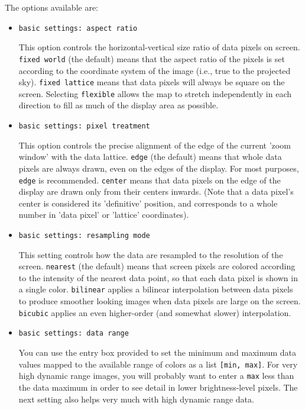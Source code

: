The options available are:
\begin{itemize}

\item {\tt basic settings: aspect ratio}

This option controls the horizontal-vertical size ratio of data pixels
on screen.  {\tt fixed world} (the default) means that the aspect
ratio of the pixels is set according to the coordinate system of
the image (i.e., true to the projected sky). {\tt fixed lattice}
means that data pixels will always be square on the screen.  Selecting
{\tt flexible} allows the map to stretch independently in each
direction to fill as much of the display area as possible.

\item {\tt basic settings: pixel treatment}

This option controls the precise alignment of the edge of the current
'zoom window' with the data lattice.  {\tt edge} (the default) means
that whole data pixels are always drawn, even on the edges of the display.
For most purposes, {\tt edge} is recommended.  {\tt center} means that
data pixels on the edge of the display are drawn only from their centers
inwards. (Note that a data pixel's center is considered its 'definitive'
position, and corresponds to a whole number in 'data pixel' or 'lattice'
coordinates).

\item {\tt basic settings: resampling mode}

This setting controls how the data are resampled to the resolution of
the screen.  {\tt nearest} (the default) means that screen pixels are
colored according to the intensity of the nearest data point, so that
each data pixel is shown in a single color. {\tt bilinear} applies a
bilinear interpolation between data pixels to produce smoother looking images
when data pixels are large on the screen.  {\tt bicubic} applies an
even higher-order (and somewhat slower) interpolation.

\item {\tt basic settings: data range}

You can use the entry box provided to set the minimum and maximum data values
mapped to the available range of colors as a list {\tt [min, max]}.  
For very high dynamic range images,
you will probably want to enter a {\tt max} less than the data maximum 
in order to see detail in lower brightness-level pixels.
The next setting also helps very much with high dynamic range data.


\end{itemize}
